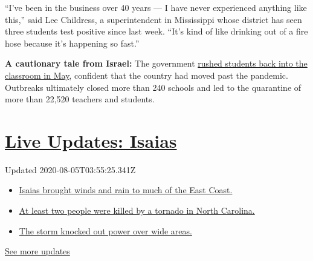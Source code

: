 ``I've been in the business over 40 years --- I have never experienced
anything like this,'' said Lee Childress, a superintendent in
Mississippi whose district has seen three students test positive since
last week. ``It's kind of like drinking out of a fire hose because it's
happening so fast.''

\textbf{A cautionary tale from Israel:} The government
\href{https://www.nytimes3xbfgragh.onion/2020/08/04/world/middleeast/coronavirus-israel-schools-reopen.html}{rushed
students back into the classroom in May}, confident that the country had
moved past the pandemic. Outbreaks ultimately closed more than 240
schools and led to the quarantine of more than 22,520 teachers and
students.

\hypertarget{live-updates-isaias}{%
\section{\texorpdfstring{\href{https://www.nytimes3xbfgragh.onion/2020/08/04/us/isaias-storm-updates.html?action=click\&pgtype=Article\&state=default\&region=MAIN_CONTENT_1\&context=storylines_live_updates}{Live
Updates: Isaias}}{Live Updates: Isaias}}\label{live-updates-isaias}}

Updated 2020-08-05T03:55:25.341Z

\begin{itemize}
\tightlist
\item
  \href{https://www.nytimes3xbfgragh.onion/2020/08/04/us/isaias-storm-updates.html?action=click\&pgtype=Article\&state=default\&region=MAIN_CONTENT_1\&context=storylines_live_updates\#link-38d68049}{Isaias
  brought winds and rain to much of the East Coast.}
\item
  \href{https://www.nytimes3xbfgragh.onion/2020/08/04/us/isaias-storm-updates.html?action=click\&pgtype=Article\&state=default\&region=MAIN_CONTENT_1\&context=storylines_live_updates\#link-7961bdbc}{At
  least two people were killed by a tornado in North Carolina.}
\item
  \href{https://www.nytimes3xbfgragh.onion/2020/08/04/us/isaias-storm-updates.html?action=click\&pgtype=Article\&state=default\&region=MAIN_CONTENT_1\&context=storylines_live_updates\#link-3480f4a1}{The
  storm knocked out power over wide areas.}
\end{itemize}

\href{https://www.nytimes3xbfgragh.onion/2020/08/04/us/isaias-storm-updates.html?action=click\&pgtype=Article\&state=default\&region=MAIN_CONTENT_1\&context=storylines_live_updates}{See
more updates}

